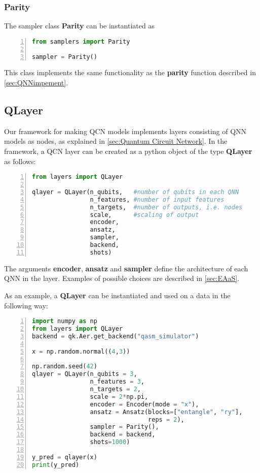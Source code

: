 \subsubsection*{Parity}
The sampler class \textbf{Parity} can be instantiated as
\begin{lstlisting}[language=python, numbers=left]
from samplers import Parity

sampler = Parity()
\end{lstlisting}
This class implements the same functionality as the \textbf{parity} function described in \cref{sec:QNNimpement}.

\subsection{QLayer}\label{sec:QLayer}

Our framework for making QCN models implements layers consisting of QNN models as nodes, as explained in \cref{sec:Quantum Circuit Network}. In the framework, a QCN layer can be created as a python object of the type \textbf{QLayer} as follows:

\begin{lstlisting}[language=python, numbers=left]
from layers import QLayer

qlayer = QLayer(n_qubits,   #number of qubits in each QNN
                n_features, #number of input features
                n_targets,  #number of outputs, i.e. nodes
                scale,      #scaling of output
                encoder,
                ansatz,
                sampler,
                backend,
                shots)
\end{lstlisting}

The arguments \textbf{encoder}, \textbf{ansatz} and \textbf{sampler} define the architecture of each QNN in the layer. Examples of possible choices are described in \cref{sec:EAaS}. 

As an example, a \textbf{QLayer} can be instantiated and used on a data in the following way:


\begin{lstlisting}[language=python, numbers=left]
import numpy as np
from layers import QLayer
backend = qk.Aer.get_backend("qasm_simulator")

x = np.random.normal((4,3))

np.random.seed(42)
qlayer = QLayer(n_qubits = 3,
                n_features = 3,
                n_targets = 2,
                scale = 2*np.pi,
                encoder = Encoder(mode = "x"),
                ansatz = Ansatz(blocks=["entangle", "ry"],
                                reps = 2),
                sampler = Parity(),
                backend = backend,
                shots=1000)
                
y_pred = qlayer(x)
print(y_pred)
\end{lstlisting}

